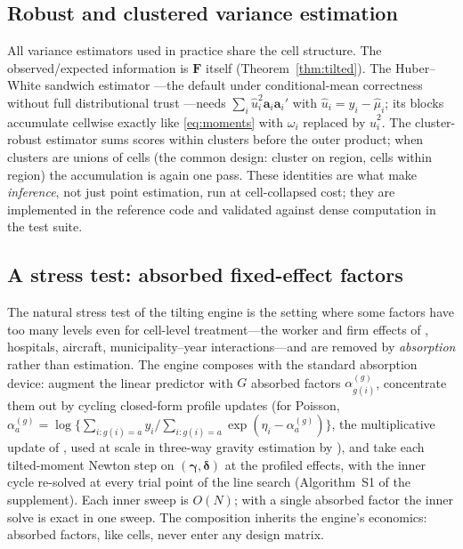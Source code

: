 \documentclass[11pt]{article}
\newcommand{\bgamma}{\bm{\gamma}}
\newcommand{\bdelta}{\bm{\delta}}
\newcommand{\ba}{\mathbf{a}}
\newcommand{\bF}{\mathbf{F}}
\begin{document}
\subsection{Robust and clustered variance estimation}\label{sec:vce}

All variance estimators used in practice share the cell structure.  The
observed/expected information is $\bF$ itself (Theorem~\ref{thm:tilted}).
The Huber--White sandwich estimator
\citep{huber1967,white1980,white1982}---the default under conditional-mean
correctness without full distributional trust
\citep{gourieroux1984}---needs $\sum_i \hat u_i^2 \ba_i \ba_i'$ with
$\hat u_i = y_i - \hat\mu_i$; its blocks accumulate cellwise exactly like
\eqref{eq:moments} with $\omega_i$ replaced by $\hat u_i^2$.  The
cluster-robust estimator \citep{liang1986,cameron2011} sums scores within
clusters before the outer product; when clusters are unions of cells (the
common design: cluster on region, cells within region) the accumulation
is again one pass.  These identities are what make \emph{inference}, not
just point estimation, run at cell-collapsed cost; they are implemented
in the reference code and validated against dense computation in the
test suite.



\subsection{A stress test: absorbed fixed-effect factors}
\label{sec:absorb-impl}

The natural stress test of the tilting engine is the setting where some
factors have too many levels even for cell-level treatment---the worker
and firm effects of \citet{abowd1999}, hospitals, aircraft,
municipality--year interactions---and are removed by \emph{absorption}
rather than estimation.  The engine composes with the standard
absorption device: augment the linear predictor with $G$ absorbed
factors $\alpha^{(g)}_{g(i)}$, concentrate them out by cycling
closed-form profile updates (for Poisson, $\alpha^{(g)}_a =
\log\{\sum_{i: g(i)=a} y_i / \sum_{i: g(i)=a} \exp(\eta_i -
\alpha^{(g)}_a)\}$, the multiplicative update of
\citealp{guimaraes2010,berge2018,correia2020}, used at scale in
three-way gravity estimation by \citealp{larch2019}), and take each
tilted-moment Newton step on $(\bgamma, \bdelta)$ at the profiled
effects, with the inner cycle re-solved at every trial point of the line
search (Algorithm~S1 of the supplement).  Each inner sweep is $O(N)$;
with a single absorbed factor the inner solve is exact in one sweep.
The composition inherits the engine's economics: absorbed factors, like
cells, never enter any design matrix.
\end{document}

